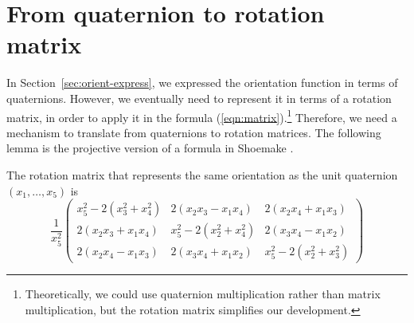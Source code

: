 \section{From quaternion to rotation matrix}
\label{sec:q2rot}

In Section~\ref{sec:orient-express}, we expressed the orientation function in terms
of quaternions.
However, we eventually need to represent it in terms of a rotation matrix,
in order to apply it in the 
formula (\ref{eqn:matrix}).\footnote{Theoretically, we could use
	quaternion multiplication rather than matrix multiplication, but
	the rotation matrix simplifies our development.}
Therefore, we need a mechanism to translate from quaternions to
rotation matrices.
The following lemma is the projective version of a 
formula in Shoemake \cite{shoemake85}.


\begin{lemma}
\label{lem:qtorot}
The rotation matrix that represents the same orientation as the 
unit quaternion \\$(x_1,\ldots,x_5)$ is
\begin{equation}
	\frac{1}{x_5^2}
	\left( \begin{array}{ccc}
	x_5^2 - 2(x_3^2 + x_4^2)& 2(x_2x_3 - x_1x_4)	& 2(x_2x_4 + x_1x_3) \\
	2(x_2x_3 + x_1x_4)	& x_5^2-2(x_2^2 + x_4^2)& 2(x_3x_4 - x_1x_2) \\
	2(x_2x_4 - x_1x_3)	& 2(x_3x_4 + x_1x_2)	& x_5^2-2(x_2^2 + x_3^2)
	\end{array} \right)
\end{equation}
\end{lemma}

